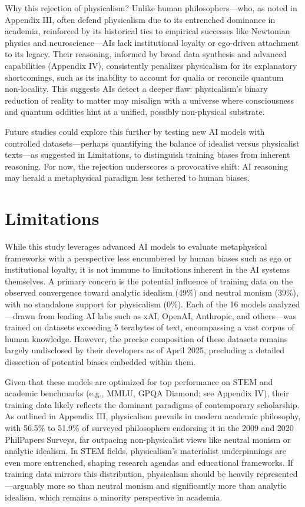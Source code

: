 \documentclass[11pt]{article}
\begin{document}
Why this rejection of physicalism? Unlike human philosophers—who, as noted in Appendix III, often defend physicalism due to its entrenched dominance in academia, reinforced by its historical ties to empirical successes like Newtonian physics and neuroscience—AIs lack institutional loyalty or ego-driven attachment to its legacy. Their reasoning, informed by broad data synthesis and advanced capabilities (Appendix IV), consistently penalizes physicalism for its explanatory shortcomings, such as its inability to account for qualia or reconcile quantum non-locality. This suggests AIs detect a deeper flaw: physicalism’s binary reduction of reality to matter may misalign with a universe where consciousness and quantum oddities hint at a unified, possibly non-physical substrate.

Future studies could explore this further by testing new AI models with controlled datasets—perhaps quantifying the balance of idealist versus physicalist texts—as suggested in Limitations, to distinguish training biases from inherent reasoning. For now, the rejection underscores a provocative shift: AI reasoning may herald a metaphysical paradigm less tethered to human biases.

\section{Limitations}
While this study leverages advanced AI models to evaluate metaphysical frameworks with a perspective less encumbered by human biases such as ego or institutional loyalty, it is not immune to limitations inherent in the AI systems themselves. A primary concern is the potential influence of training data on the observed convergence toward analytic idealism (49\%) and neutral monism (39\%), with no standalone support for physicalism (0\%). Each of the 16 models analyzed—drawn from leading AI labs such as xAI, OpenAI, Anthropic, and others—was trained on datasets exceeding 5 terabytes of text, encompassing a vast corpus of human knowledge. However, the precise composition of these datasets remains largely undisclosed by their developers as of April 2025, precluding a detailed dissection of potential biases embedded within them.

Given that these models are optimized for top performance on STEM and academic benchmarks (e.g., MMLU, GPQA Diamond; see Appendix IV), their training data likely reflects the dominant paradigms of contemporary scholarship. As outlined in Appendix III, physicalism prevails in modern academic philosophy, with 56.5\% to 51.9\% of surveyed philosophers endorsing it in the 2009 and 2020 PhilPapers Surveys, far outpacing non-physicalist views like neutral monism or analytic idealism. In STEM fields, physicalism’s materialist underpinnings are even more entrenched, shaping research agendas and educational frameworks. If training data mirrors this distribution, physicalism should be heavily represented—arguably more so than neutral monism and significantly more than analytic idealism, which remains a minority perspective in academia.
\end{document}
